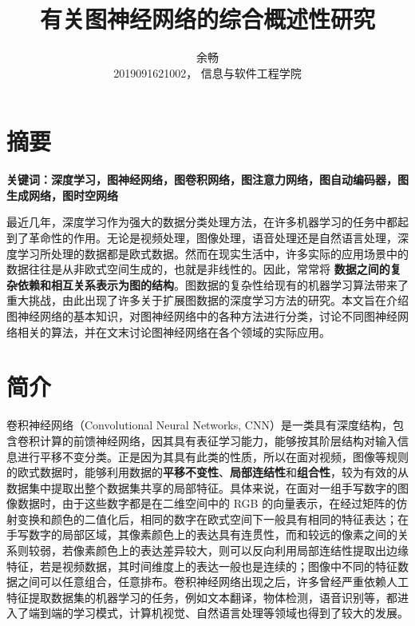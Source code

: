 \documentclass[UTF8]{ctexart}
\title{有关图神经网络的综合概述性研究}
\author{余畅 \\ 2019091621002， 信息与软件工程学院}
\begin{document}
\maketitle

\section{摘要}
\textbf{关键词：深度学习，图神经网络，图卷积网络，图注意力网络，图自动编码器，图生成网络，图时空网络} \par
最近几年，深度学习作为强大的数据分类处理方法，在许多机器学习的任务中都起到了革命性的作用。无论是视频处理，图像处理，语音处理还是自然语言处理，深度学习所处理的数据都是欧式数据。然而在现实生活中，许多实际的应用场景中的数据往往是从非欧式空间生成的，也就是非线性的。因此，常常将 \textbf{数据之间的复杂依赖和相互关系表示为图的结构}。图数据的复杂性给现有的机器学习算法带来了重大挑战，由此出现了许多关于扩展图数据的深度学习方法的研究。本文旨在介绍图神经网络的基本知识，对图神经网络中的各种方法进行分类，讨论不同图神经网络相关的算法，并在文末讨论图神经网络在各个领域的实际应用。

\section{简介}

卷积神经网络（Convolutional Neural Networks, CNN）是一类具有深度结构，包含卷积计算的前馈神经网络，因其具有表征学习能力，能够按其阶层结构对输入信息进行平移不变分类。正是因为其具有此类的性质，所以在面对视频，图像等规则的欧式数据时，能够利用数据的\textbf{平移不变性}、\textbf{局部连结性}和\textbf{组合性}，较为有效的从数据集中提取出整个数据集共享的局部特征。具体来说，在面对一组手写数字的图像数据时，由于这些数字都是在二维空间中的 RGB 的向量表示，在经过矩阵的仿射变换和颜色的二值化后，相同的数字在欧式空间下一般具有相同的特征表达；在手写数字的局部区域，其像素颜色上的表达具有连贯性，而和较远的像素之间的关系则较弱，若像素颜色上的表达差异较大，则可以反向利用局部连结性提取出边缘特征，若是视频数据，其时间维度上的表达一般也是连续的；图像中不同的特征数据之间可以任意组合，任意排布。卷积神经网络出现之后，许多曾经严重依赖人工特征提取数据集的机器学习的任务，例如文本翻译，物体检测，语音识别等，都进入了端到端的学习模式，计算机视觉、自然语言处理等领域也得到了较大的发展。 \par
\end{document}
